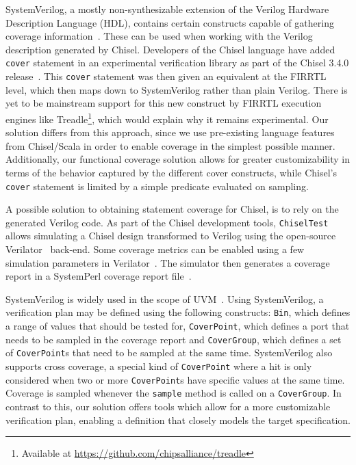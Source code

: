 \documentclass[conference]{IEEEtran}
\begin{document}
SystemVerilog, a mostly non-synthesizable extension of the Verilog Hardware Description Language (HDL), contains certain constructs capable of gathering coverage information~\cite{spear2008systemverilog}. These can be used when working with the Verilog description generated by Chisel. Developers of the Chisel language have added \texttt{cover} statement in an experimental verification library as part of the Chisel 3.4.0 release~\cite{chisel3.4release_notes}. This \texttt{cover} statement was then given an equivalent at the FIRRTL level, which then maps down to SystemVerilog rather than plain Verilog. There is yet to be mainstream support for this new construct by FIRRTL execution engines like Treadle\footnote{Available at \url{https://github.com/chipsalliance/treadle}}, which would explain why it remains experimental. Our solution differs from this approach, since we use pre-existing language features from Chisel/Scala in order to enable coverage in the simplest possible manner. Additionally, our functional coverage solution allows for greater customizability in terms of the behavior captured by the different cover constructs, while Chisel's \texttt{cover} statement is limited by a simple predicate evaluated on sampling.   
  
A possible solution to obtaining statement coverage for Chisel, is to rely on the generated Verilog code. 
As part of the Chisel development tools, \texttt{ChiselTest} allows simulating a Chisel design transformed to Verilog using the open-source Verilator~\cite{verilator} back-end.
Some coverage metrics can be enabled using a few simulation parameters in Verilator~\cite{tolotto2020}.
The simulator then generates a coverage report in a SystemPerl coverage report file~\cite{SystemPerl}.

SystemVerilog is widely used in the scope of UVM~\cite{uvm2015}. 
Using SystemVerilog, a verification plan may be defined using the following constructs: \texttt{Bin}, which defines a range of values that should be tested for, \texttt{CoverPoint}, which defines a port that needs to be sampled in the coverage report and \texttt{CoverGroup}, which defines a set of \texttt{CoverPoint}s that need to be sampled at the same time. 
SystemVerilog also supports cross coverage, a special kind of \texttt{CoverPoint} where a hit is only considered when two or more \texttt{CoverPoint}s have specific values at the same time.
Coverage is sampled whenever the \texttt{sample} method is called on a \texttt{CoverGroup}. 
In contrast to this, our solution offers tools which allow for a more customizable verification plan, enabling a definition that closely models the target specification.
\end{document}
